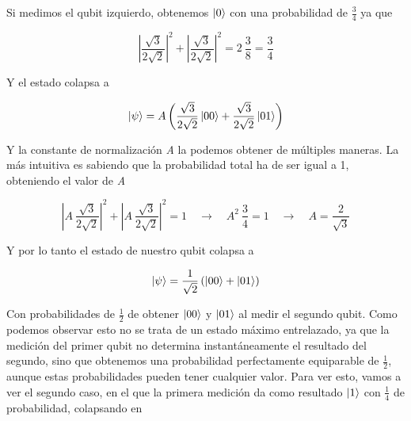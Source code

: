 \documentclass[12pt]{article}
\numberwithin{equation}{section} %
\begin{document}
    \vspace{2.5mm}

    Si medimos el qubit izquierdo, obtenemos \( \ket{0} \) con una probabilidad de \( \frac{3}{4} \) ya que

    \begin{equation*}
        \left| \frac{\sqrt{3}}{2 \sqrt{2}} \right|^{2} + \left| \frac{\sqrt{3}}{2 \sqrt{2}} \right|^{2} = 2 \ \frac{3}{8} = \frac{3}{4}
    \end{equation*}

    \vspace{2.5mm}

    Y el estado colapsa a 

    \begin{equation*}
        \ket{\psi} = A \left( \frac{\sqrt{3}}{2 \sqrt{2}} \ket{0 0} + \frac{\sqrt{3}}{2 \sqrt{2}} \ket{0 1} \right)
    \end{equation*}

    \vspace{2.5mm}

    Y la constante de normalización \textit{A} la podemos obtener de múltiples maneras. La más intuitiva es sabiendo que la probabilidad total ha de ser igual a 1, obteniendo el valor de \textit{A}

    \begin{equation*}
        \left| A \ \frac{\sqrt{3}}{2 \sqrt{2}} \right|^{2} + \left| A \ \frac{\sqrt{3}}{2 \sqrt{2}} \right|^{2} = 1 \quad \rightarrow \quad A^{2} \ \frac{3}{4} = 1 \quad \rightarrow \quad A = \frac{2}{\sqrt{3}}
    \end{equation*}

    \vspace{2.5mm}

    Y por lo tanto el estado de nuestro qubit colapsa a

    \begin{equation*}
        \ket{\psi} = \frac{1}{\sqrt{2}} \left( \ket{0 0} + \ket{0 1} \right)  
    \end{equation*}

    \vspace{2.5mm}

    Con probabilidades de \( \frac{1}{2} \) de obtener \( \ket{0 0} \) y \( \ket{0 1} \) al medir el segundo qubit. Como podemos observar esto no se trata de un estado máximo entrelazado, ya que la medición del primer qubit no determina instantáneamente el resultado del segundo, sino que obtenemos una probabilidad perfectamente equiparable de \( \frac{1}{2} \), aunque estas probabilidades pueden tener cualquier valor. Para ver esto, vamos a ver el segundo caso, en el que la primera medición da como resultado \( \ket{1} \) con \( \frac{1}{4} \) de probabilidad, colapsando en
\end{document}
